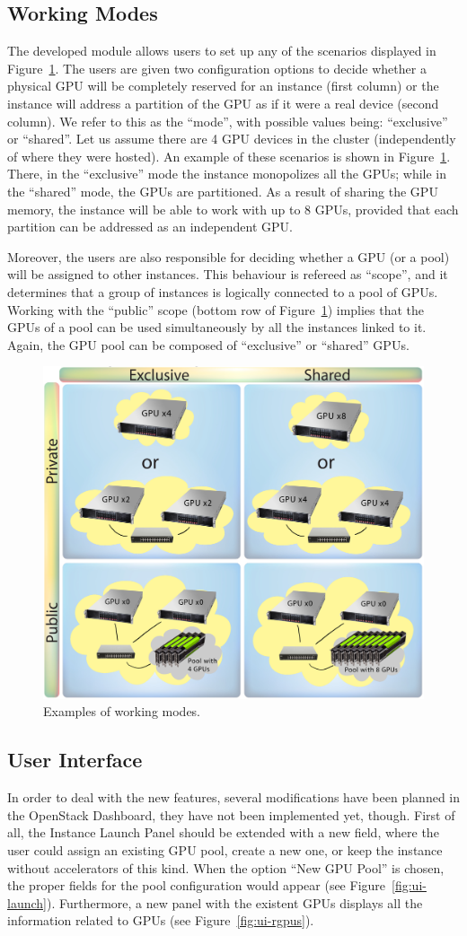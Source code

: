 \documentclass[a4paper,twoside]{article}
\begin{document}
\subsection{Working Modes}
The developed module allows users to set up any of the scenarios displayed in Figure~\ref{fig2}. 
The users are given two configuration options to decide whether a physical GPU will be completely reserved for an instance (first column) or the instance will address a partition of the GPU as if it were a real device (second column).
We refer to this as the ``mode'', with possible values being: ``exclusive'' or ``shared''. 
Let us assume there are 4 GPU devices in the cluster (independently of where they were hosted). 
An example of these scenarios is shown in Figure~\ref{fig2}.
There, in the ``exclusive'' mode the instance monopolizes all the GPUs; while in the ``shared'' mode, the GPUs are partitioned. 
As a result of sharing the GPU memory, the instance will be able to work with up to 8 GPUs, provided that each partition can be addressed as an independent GPU.

Moreover, the users are also responsible for deciding whether a GPU (or a pool) will be assigned to other instances. 
This behaviour is refereed as ``scope'', and it determines that a group of instances is logically connected to a pool of GPUs.
Working with the ``public'' scope (bottom row of Figure~\ref{fig2}) implies that the GPUs of a pool can be used simultaneously by all the instances linked to it.
Again, the GPU pool can be composed of ``exclusive'' or ``shared'' GPUs.

\begin{figure}[htb]
  \centering
  \includegraphics[width=.5\textwidth]{images/workingmodes.jpg}
  \caption{Examples of working modes.}
  \label{fig2}
\end{figure}

\subsection{User Interface}
In order to deal with the new features, several modifications have been planned in the OpenStack Dashboard, they have not been implemented yet, though.
First of all, the Instance Launch Panel should be extended with a new field, where the user could assign an existing GPU pool, create a new one, or keep the instance without accelerators of this kind.
When the option ``New GPU Pool'' is chosen, the proper fields for the pool configuration would appear (see Figure~\ref{fig:ui-launch}).
Furthermore, a new panel with the existent GPUs displays all the information related to GPUs (see Figure~\ref{fig:ui-rgpus}).
\end{document}
